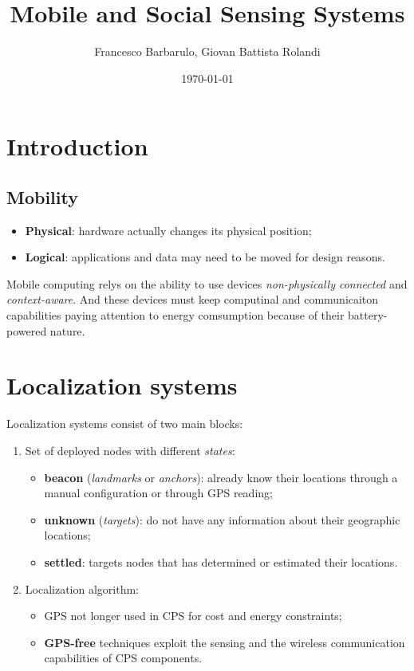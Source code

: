 \documentclass[a4paper,12pt]{article}
\title{Mobile and Social Sensing Systems}
\author{Francesco Barbarulo, Giovan Battista Rolandi}
\date{\monthyeardate\today}
\begin{document}

\maketitle
{}

\tableofcontents

\newpage


\section{Introduction}
\subsection{Mobility}
\begin{itemize}
    \item \textbf{Physical}: hardware actually changes its physical position;
    \item \textbf{Logical}: applications and data may need to be moved for design reasons.
\end{itemize}

Mobile computing relys on the ability to use devices \textit{non-physically connected} and \textit{context-aware}. And these devices must keep computinal and communicaiton capabilities paying attention to energy comsumption because of their battery-powered nature.

\section{Localization systems}
Localization systems consist of two main blocks:
\begin{enumerate}[label=\roman*.]
	\item Set of deployed nodes with different \textit{states}:
		\begin{itemize}
		 	\item \textbf{beacon} (\textit{landmarks} or \textit{anchors}): already know their locations through a manual configuration or through GPS reading;
		  	\item \textbf{unknown} (\textit{targets}): do not have any information about their geographic locations;
		  	\item \textbf{settled}: targets nodes that has determined or estimated their locations.
		\end{itemize}
	\item Localization algorithm:
		\begin{itemize}
			\item GPS not longer used in CPS for cost and energy constraints;
			\item \textbf{GPS-free} techniques exploit the sensing and the wireless communication capabilities of CPS components.
		\end{itemize}
\end{enumerate}
\end{document}
